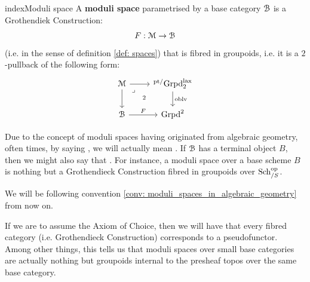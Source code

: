             \begin{definition} \label{def: moduli_space} index{Moduli space}
                A \textbf{moduli space} parametrised by a base category $\mathcal{B}$ is a Grothendiek Construction:
                    $$F: \mathcal{M} \to \mathcal{B}$$
                (i.e.  in the sense of definition \ref{def: spaces}) that is fibred in groupoids, i.e. it is a $2$-pullback of the following form:
                    $$
                        \begin{tikzcd}
                        	{\calM} & {{}^{\pt/}\Grpd^{\lax}_2} \\
                        	\calB & {\Grpd^2}
                        	\arrow[from=1-1, to=2-1]
                        	\arrow["F", from=2-1, to=2-2]
                        	\arrow["\oblv", from=1-2, to=2-2]
                        	\arrow[from=1-1, to=1-2]
                        	\arrow["2"{description}, "\lrcorner"{anchor=center, pos=0.125}, draw=none, from=1-1, to=2-2]
                        \end{tikzcd}
                    $$
            \end{definition}
            \begin{convention} \label{conv: moduli_spaces_in_algebraic_geometry}
                Due to the concept of moduli spaces having originated from algebraic geometry, often times, by saying , we will actually mean . If $\mathcal{B}$ has a terminal object $B$, then we might also say that . For instance, a moduli space over a base scheme $B$ is nothing but a Grothendieck Construction fibred in groupoids over $\mathrm{Sch}_{/S}^{\mathrm{op}}$.
            \end{convention}
            We will be following convention \ref{conv: moduli_spaces_in_algebraic_geometry} from now on.
            \begin{remark} \label{remark: moduli_spaces_over_small_categories}
                If we are to assume the Axiom of Choice, then we will have that every fibred category (i.e. Grothendieck Construction) corresponds to a pseudofunctor. Among other things, this tells us that moduli spaces over small base categories are actually nothing but groupoids internal to the presheaf topos over the same base category. 
            \end{remark}
